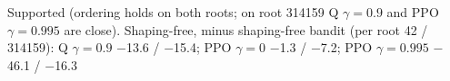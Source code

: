 Supported (ordering holds on both roots; on root 314159 Q $\gamma=0.9$ and PPO $\gamma=0.995$ are close). Shaping-free, minus shaping-free bandit (per root 42 / 314159): Q $\gamma=0.9$ \ensuremath{-}13.6 / \ensuremath{-}15.4; PPO $\gamma=0$ \ensuremath{-}1.3 / \ensuremath{-}7.2; PPO $\gamma=0.995$ \ensuremath{-}46.1 / \ensuremath{-}16.3